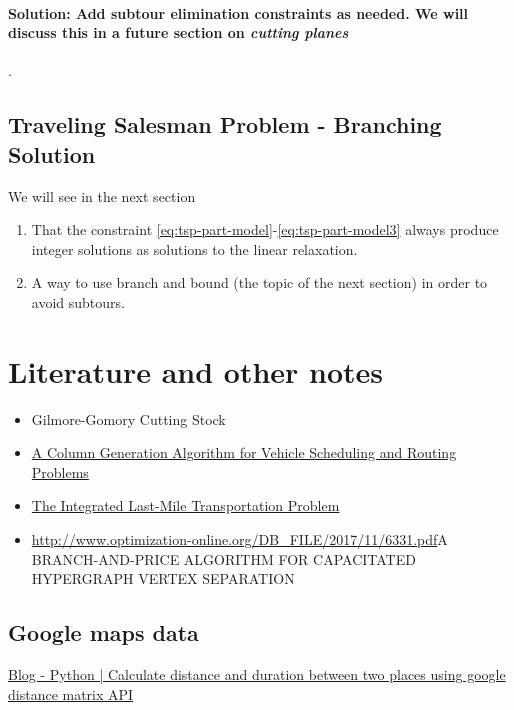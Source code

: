\documentclass[../open-optimization/open-optimization.tex]{subfiles}
\begin{document}
\paragraph{Solution: Add subtour elimination constraints as needed.  We will discuss this in a future section on \emph{cutting planes}}.

\subsection{Traveling Salesman Problem - Branching Solution}
We will see in the next section
\begin{enumerate}
\item That the constraint \eqref{eq:tsp-part-model}-\eqref{eq:tsp-part-model3}  always produce integer solutions as solutions to the linear relaxation.
\item A way to use branch and bound (the topic of the next section) in order to avoid subtours.
\end{enumerate}






\section{Literature and other notes}


\begin{itemize}
\item Gilmore-Gomory Cutting Stock~\cite{Gilmore-Gomory}
\item \href{http://www.optimization-online.org/DB_HTML/2018/06/6648.html}{A Column Generation Algorithm for Vehicle Scheduling and Routing Problems}
\item \href{http://www.optimization-online.org/DB_HTML/2018/06/6670.html}{The Integrated Last-Mile Transportation Problem}
\item \url{http://www.optimization-online.org/DB_FILE/2017/11/6331.pdf}{A BRANCH-AND-PRICE ALGORITHM FOR CAPACITATED
HYPERGRAPH VERTEX SEPARATION}
\end{itemize}
\subsection{Google maps data}
\href{https://www.geeksforgeeks.org/python-calculate-distance-duration-two-places-using-google-distance-matrix-api/}{Blog - Python | Calculate distance and duration between two places using google distance matrix API}
\end{document}
